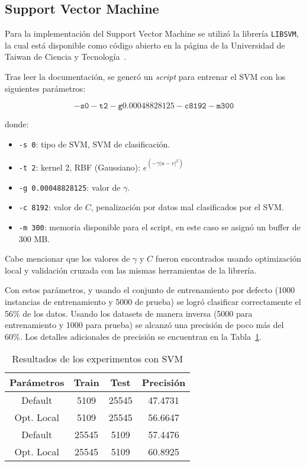 \documentclass{llncs}
\begin{document}
\subsection{Support Vector Machine}
\label{subsec:svm}

Para la implementación del Support Vector Machine se utilizó la librería \texttt{LIBSVM}, la cual está disponible como código abierto en la página de la Universidad de Taiwan de Ciencia y Tecnología~\cite{LIBSVM}.

Tras leer la documentación, se generó un \textit{script} para entrenar el SVM con los siguientes parámetros:

$$\mathtt{-s 0 -t 2 -g 0.00048828125 -c 8192 -m 300}$$

donde:

\begin{itemize}
	\item \texttt{-s 0}: tipo de SVM, SVM de clasificación.
	\item \texttt{-t 2}: kernel 2, RBF (Gaussiano): $e^{(-\gamma |u-v|^2)}$
	\item \texttt{-g 0.00048828125}: valor de $\gamma$.
	\item \texttt{-c 8192}: valor de $C$, penalización por datos mal clasificados por el SVM.
	\item \texttt{-m 300}: memoria disponible para el script, en este caso se asignó un buffer de 300 MB.
\end{itemize}

Cabe mencionar que los valores de $\gamma$ y $C$ fueron encontrados usando optimización local y validación cruzada con las mismas herramientas de la librería.

Con estos parámetros, y usando el conjunto de entrenamiento por defecto (1000 instancias de entrenamiento y 5000 de prueba) se logró clasificar correctamente el 56\% de los datos.
Usando los datasets de manera inversa (5000 para entrenamiento y 1000 para prueba) se alcanzó una precisión de poco más del 60\%.
Los detalles adicionales de precisión se encuentran en la Tabla~\ref{tab:svm}.

\begin{table}[htbp]
\centering
\caption{Resultados de los experimentos con SVM}
\label{tab:svm}
\begin{tabular}{@{}cccc@{}}
\toprule
Parámetros & Train & Test  & Precisión \\ \midrule
Default    & 5109  & 25545 & 47.4731   \\
Opt. Local & 5109  & 25545 & 56.6647   \\
Default    & 25545 & 5109  & 57.4476   \\
Opt. Local & 25545 & 5109  & 60.8925   \\ \bottomrule
\end{tabular}
\end{table}
\end{document}
